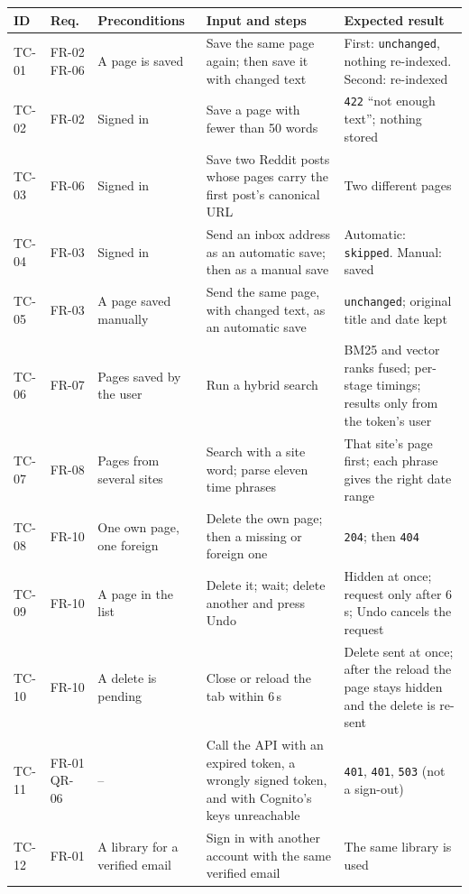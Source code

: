 {\footnotesize
\begin{longtable}{>{\ttfamily}p{} >{\ttfamily}p{} >{\raggedright\arraybackslash}p{} >{\raggedright\arraybackslash}p{} >{\raggedright\arraybackslash}p{}}
\toprule
\textrm{\textbf{ID}} & \textrm{\textbf{Req.}} & \textbf{Preconditions} & \textbf{Input and steps} & \textbf{Expected result} \\
\midrule
\endhead
TC-01 & FR-02 FR-06 & A page is saved & Save the same page again; then save it with changed text & First: \texttt{unchanged}, nothing re-indexed. Second: re-indexed \\
TC-02 & FR-02 & Signed in & Save a page with fewer than 50 words & \texttt{422} ``not enough text''; nothing stored \\
TC-03 & FR-06 & Signed in & Save two Reddit posts whose pages carry the first post's canonical URL & Two different pages \\
TC-04 & FR-03 & Signed in & Send an inbox address as an automatic save; then as a manual save & Automatic: \texttt{skipped}. Manual: saved \\
TC-05 & FR-03 & A page saved manually & Send the same page, with changed text, as an automatic save & \texttt{unchanged}; original title and date kept \\
TC-06 & FR-07 & Pages saved by the user & Run a hybrid search & BM25 and vector ranks fused; per-stage timings; results only from the token's user \\
TC-07 & FR-08 & Pages from several sites & Search with a site word; parse eleven time phrases & That site's page first; each phrase gives the right date range \\
TC-08 & FR-10 & One own page, one foreign & Delete the own page; then a missing or foreign one & \texttt{204}; then \texttt{404} \\
TC-09 & FR-10 & A page in the list & Delete it; wait; delete another and press Undo & Hidden at once; request only after 6\,s; Undo cancels the request \\
TC-10 & FR-10 & A delete is pending & Close or reload the tab within 6\,s & Delete sent at once; after the reload the page stays hidden and the delete is re-sent \\
TC-11 & FR-01 QR-06 & -- & Call the API with an expired token, a wrongly signed token, and with Cognito's keys unreachable & \texttt{401}, \texttt{401}, \texttt{503} (not a sign-out) \\
TC-12 & FR-01 & A library for a verified email & Sign in with another account with the same verified email & The same library is used \\

\end{longtable}}
